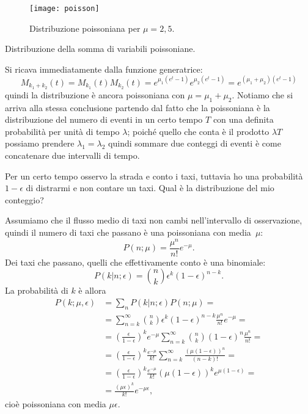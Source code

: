 \begin{figure}
	\centering
	\texttt{[image: poisson]}
	\caption{Distribuzione poissoniana per $\mu=2,5$.}
\end{figure}

\begin{exercise}
	Distribuzione della somma di variabili poissoniane.
\end{exercise}

\begin{solution}
	Si ricava immediatamente dalla funzione generatrice:
	\begin{equation*}
		M_{k_1+k_2}(t) =
		M_{k_1}(t)M_{k_2}(t) =
		e^{\mu_1(e^t-1)} e^{\mu_2(e^t-1)} =
		e^{(\mu_1+\mu_2)(e^t-1)}
	\end{equation*}
	quindi la distribuzione è ancora poissoniana con $\mu=\mu_1+\mu_2$.
	Notiamo che si arriva alla stessa conclusione partendo dal fatto che la poissoniana è la distribuzione del numero di eventi in un certo tempo $T$ con una definita probabilità per unità di tempo $\lambda$; poiché quello che conta è il prodotto $\lambda T$ possiamo prendere $\lambda_1=\lambda_2$ quindi sommare due conteggi di eventi è come concatenare due intervalli di tempo.
\end{solution}

\begin{exercise}
	Per un certo tempo osservo la strada e conto i taxi,
	tuttavia ho una probabilità $1-\epsilon$ di distrarmi e non contare un taxi.
	Qual è la distribuzione del mio conteggio?
\end{exercise}

\begin{solution*}
	Assumiamo che il flusso medio di taxi non cambi nell'intervallo di osservazione,
	quindi il numero di taxi che passano è una poissoniana con media~$\mu$:
	\begin{equation*}
		P(n;\mu) = \frac{\mu^n}{n!}e^{-\mu}.
	\end{equation*}
	Dei taxi che passano, quelli che effettivamente conto è una binomiale:
	\begin{equation*}
		P(k|n;\epsilon) = \binom nk \epsilon^k (1-\epsilon)^{n-k}.
	\end{equation*}
	La probabilità di $k$ è allora
	\begin{align*}
		P(k;\mu,\epsilon) &=
		\sum_n P(k|n;\epsilon) P(n;\mu) = \\
		&= \sum_{n=k}^\infty \binom nk \epsilon^k (1-\epsilon)^{n-k} \frac{\mu^n}{n!}e^{-\mu} = \\
		&= \left( \frac\epsilon{1-\epsilon} \right)^k e^{-\mu} \sum_{n=k}^\infty \binom nk (1-\epsilon)^n \frac{\mu^n}{n!} = \\
		&= \left( \frac\epsilon{1-\epsilon} \right)^k \frac{e^{-\mu}}{k!} \sum_{n=k}^\infty \frac{(\mu(1-\epsilon))^n}{(n-k)!} = \\
		&= \left( \frac\epsilon{1-\epsilon} \right)^k \frac{e^{-\mu}}{k!} (\mu(1-\epsilon))^k e^{\mu(1-\epsilon)} = \\
		&= \frac{(\mu\epsilon)^k}{k!}e^{-\mu\epsilon},
	\end{align*}
	cioè poissoniana con media $\mu\epsilon$.
\end{solution*}

